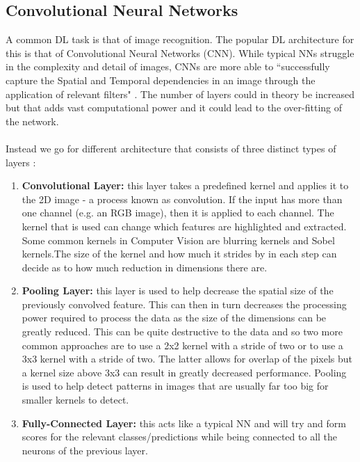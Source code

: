 \subsection{Convolutional Neural Networks}
A common DL task is that of image recognition. The popular DL architecture for this is that of Convolutional Neural Networks (CNN). 
While typical NNs struggle in the complexity and detail of images, CNNs are more able to ``successfully capture the Spatial and Temporal dependencies in an image through the application of relevant filters" \cite{eli5_convnet}. 
The number of layers could in theory be increased but that adds vast computational power and it could lead to the over-fitting of the network. \\ \\
Instead we go for different architecture that consists of three distinct types of layers \cite{convnet}:
\begin{enumerate}
    \item \textbf{Convolutional Layer:} this layer takes a predefined kernel \cite{kernel} and applies it to the 2D image - a process known as convolution. 
    If the input has more than one channel (e.g. an RGB image), then it is applied to each channel. 
    The kernel that is used can change which features are highlighted and extracted. 
    Some common kernels in Computer Vision are blurring kernels and Sobel kernels.The size of the kernel and how much it strides by in each step can decide as to how much reduction in dimensions there are.
    
    \item \textbf{Pooling Layer:} this layer is used to help decrease the spatial size of the previously convolved feature. 
    This can then in turn decreases the processing power required to process the data as the size of the dimensions can be greatly reduced. 
    This can be quite destructive to the data and so two more common approaches are to use a 2x2 kernel with a stride of two or to use a 3x3 kernel with a stride of two. 
    The latter allows for overlap of the pixels but a kernel size above 3x3 can result in greatly decreased performance. 
    Pooling is used to help detect patterns in images that are usually far too big for smaller kernels to detect.
    
    \item \textbf{Fully-Connected Layer:} this acts like a typical NN and will try and form scores for the relevant classes/predictions while being connected to all the neurons of the previous layer.
\end{enumerate}
